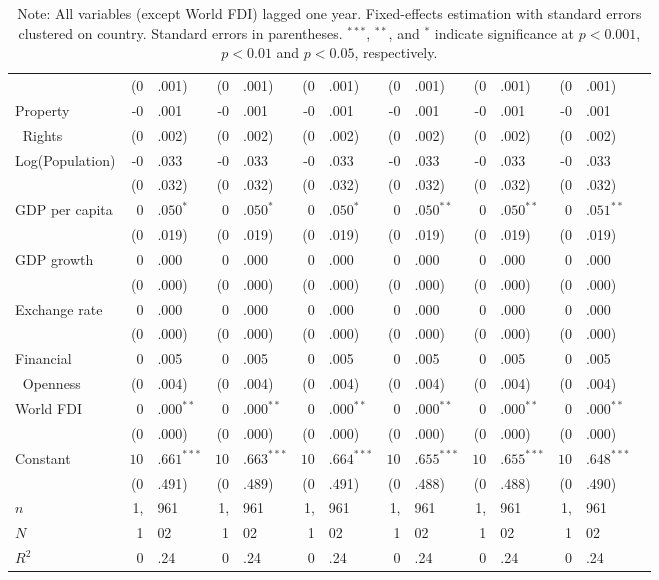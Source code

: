 \documentclass[12pt,onesided]{amsart}
\begin{document}
\begin{table}[ht]
{\begin{tabular}{lr@{} lr@{}lr@{}lr@{}lr@{}lr@{}lr@{} }
	~ & (0&.001) & (0&.001) & (0&.001) & (0&.001) & (0&.001) &(0&.001) \\
	Property & -0&.001 & -0&.001 & -0&.001 & -0&.001 & -0&.001 & -0&.001 \\
	$\;\;$Rights & (0&.002) & (0&.002) & (0&.002) & (0&.002) & (0&.002) & (0&.002) \\
	\multirow{2}{*}{Log(Population)} & -0&.033 & -0&.033 & -0&.033 & -0&.033 & -0&.033 & -0&.033 \\
	& (0&.032) & (0&.032) & (0&.032) & (0&.032) & (0&.032) & (0&.032) \\
	\multirow{2}{*}{GDP per capita} & $0$&$.050^{\ast}$ & $0$&$.050^{\ast}$ & $0$&$.050^{\ast}$ & $0$&$.050^{\ast\ast}$ & $0$&$.050^{\ast\ast}$ & $0$&$.051^{\ast\ast}$ \\
	& (0&.019) & (0&.019) & (0&.019) & (0&.019) & (0&.019) & (0&.019) \\
	\multirow{2}{*}{GDP growth} & 0&.000 & 0&.000 & 0&.000 & 0&.000 & 0&.000 & 0&.000 \\
	& (0&.000) & (0&.000) & (0&.000) & (0&.000) & (0&.000) &(0&.000) \\
	\multirow{2}{*}{Exchange rate} & 0&.000 & 0&.000 & 0&.000 & 0&.000 & 0&.000 & 0&.000 \\
	& (0&.000) & (0&.000) & (0&.000) & (0&.000) & (0&.000) &(0&.000) \\
	Financial & 0&.005 & 0&.005 & 0&.005 & 0&.005 & 0&.005 & 0&.005 \\
	$\;\;$Openness & (0&.004) & (0&.004) & (0&.004) & (0&.004) & (0&.004) &(0&.004) \\
	\multirow{2}{*}{World FDI} & $0$&$.000^{\ast\ast}$ & $0$&$.000^{\ast\ast}$ & $0$&$.000^{\ast\ast}$ & $0$&$.000^{\ast\ast}$ & $0$&$.000^{\ast\ast}$ & $0$&$.000^{\ast\ast}$ \\
	& (0&.000) & (0&.000) & (0&.000) & (0&.000) & (0&.000) &(0&.000) \\
	\multirow{2}{*}{Constant} & $10$&$.661^{\ast\ast\ast}$ & $10$&$.663^{\ast\ast\ast}$ & $10$&$.664^{\ast\ast\ast}$ & $10$&$.655^{\ast\ast\ast}$ & $10$&$.655^{\ast\ast\ast}$ & $10$&$.648^{\ast\ast\ast}$ \\
	& (0&.491) & (0&.489) & (0&.491) & (0&.488) & (0&.488) & (0&.490) \\ \hline
	$n$ & 1,&961 & 1,&961 & 1,&961 & 1,&961 & 1,&961 & 1,&961 \\
	$N$ & 1&02 & 1&02 & 1&02 & 1&02 & 1&02 & 1&02 \\
	$R^{2}$ & 0&.24 & 0&.24 & 0&.24 & 0&.24 & 0&.24 & 0&.24 \\
	\hline\hline
\end{tabular}
\caption*{Note: All variables (except World FDI) lagged one year. Fixed-effects estimation with standard errors clustered on country. Standard errors in parentheses. $^{***}$, $^{**}$, and $^{*}$ indicate significance at $p<0.001$, $p<0.01$ and $p<0.05$, respectively.}
}
\end{table}
\end{document}
